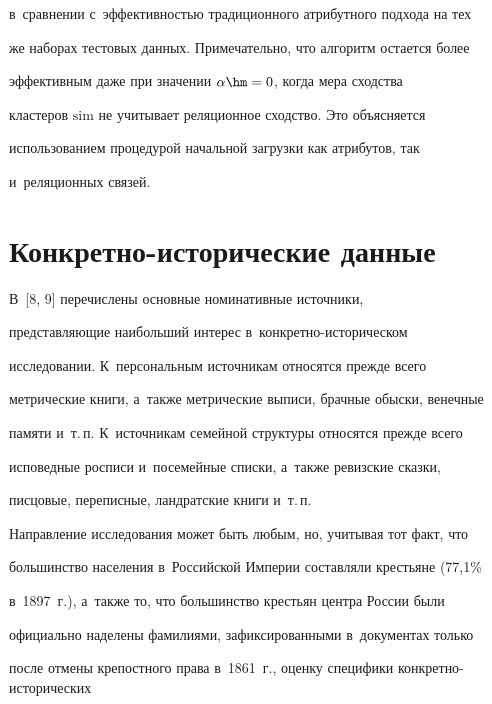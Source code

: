 в~сравнении с~эф\-фек\-тив\-ностью традиционного атрибутного подхода на тех 


же наборах тес\-то\-вых данных. Примечательно, что алгоритм остается более 


эффективным даже при значении $\alpha\hm=0$, когда мера сходства 


клас\-те\-ров $\mathrm{sim}$ не учитывает реляционное сходство. Это объясняется 


использованием процедурой начальной загрузки как атрибутов, так 


и~реляционных связей.


  








\section{Конкретно-исторические данные}


  


  В~[8, 9] перечислены основные номинативные источники, 


пред\-став\-ля\-ющие наибольший интерес в~кон\-крет\-но-ис\-то\-ри\-че\-ском 


исследовании. К~персональным источникам относятся преж\-де всего 


метрические книги, а~также мет\-ри\-че\-ские выписи, брач\-ные обыс\-ки, венечные 


памяти и~т.\,п. К~источникам семейной структуры относятся преж\-де всего 


исповедные росписи и~посемейные спис\-ки, а~также ревизские сказки, 


писцовые, переписные, ландратские книги и~т.\,п.


  


  Направление исследования может быть любым, но, учитывая тот факт, что 


большинство населения в~Российской Империи со\-став\-ля\-ли крестьяне (77,1\% 


в~1897~г.), а~также то, что большинство крестьян центра России были 


официально наделены фамилиями, зафиксированными в~документах только 


после отмены крепостного права в~1861~г., оценку специфики кон\-крет\-но-ис\-то\-ри\-че\-ских 


